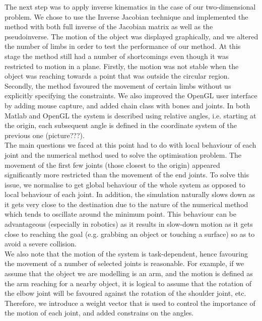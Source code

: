\documentclass[paper=a4, fontsize=11pt]{scrartcl} %
\numberwithin{equation}{section} %
\numberwithin{figure}{section} %
\numberwithin{table}{section} %
\begin{document}
The next step was to apply inverse kinematics in the case of our two-dimensional problem. We chose to use the Inverse Jacobian technique and implemented the method with both full inverse of the Jacobian matrix as well as the pseudoinverse. The motion of the object was displayed graphically, and we altered the number of limbs in order to test the performance of our method. At this stage the method still had a number of shortcomings even though it was restricted to motion in a plane. Firstly, the motion was not stable when the object was reaching towards a point that was outside the circular region. Secondly, the method favoured the movement of certain limbs without us explicitly specifying the constraints. We also improved the OpenGL user interface by adding mouse capture, and added chain class with bones and joints. In both Matlab and OpenGL the system is described using relative angles, i.e. starting at the origin, each subsequent angle is defined in the coordinate system of the previous one (picture???). \\

The main questions we faced at this point had to do with local behaviour of each joint and the numerical method used to solve the optimisation problem. The movement of the first few joints (those closest to the origin) appeared significantly more restricted than the movement of the end joints. To solve this issue, we normalise to get global behaviour of the whole system as opposed to local behaviour of each joint. In addition, the simulation naturally slows down as it gets very close to the destination due to the nature of the numerical method which tends to oscillate around the minimum point. This behaviour can be advantageous (especially in robotics) as it results in slow-down motion as it gets close to reaching the goal (e.g. grabbing an object or touching a surface) so as to avoid a severe collision. \\

We also note that the motion of the system is task-dependent, hence favouring the movement of a number of selected joints is reasonable. For example, if we assume that the object we are modelling is an arm, and the motion is defined as the arm reaching for a nearby object, it is logical to assume that the rotation of the elbow joint will be favoured against the rotation of the shoulder joint, etc. Therefore, we introduce a weight vector that is used to control the importance of the motion of each joint, and added constrains on the angles.\\
\end{document}

